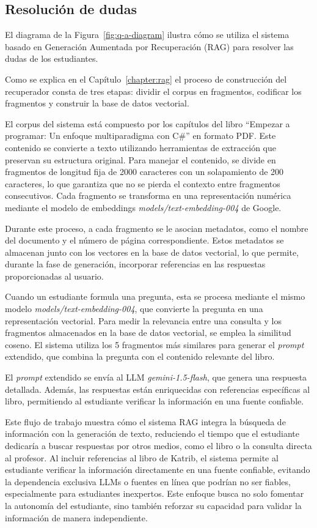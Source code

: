 \documentclass{article}
\begin{document}
\subsection{Resolución de dudas}

El diagrama de la Figura~\ref{fig:q-a-diagram} ilustra cómo se utiliza el sistema basado en Generación Aumentada por Recuperación (RAG) para resolver las dudas de los estudiantes.

Como se explica en el Capítulo~\ref{chapter:rag} el proceso de construcción del recuperador consta de tres etapas: dividir el corpus en fragmentos, codificar los fragmentos y construir la base de datos vectorial.

El corpus del sistema está compuesto por los capítulos del libro ``Empezar a programar: Un enfoque multiparadigma con C\#'' en formato PDF. Este contenido se convierte a texto utilizando herramientas de extracción que preservan su estructura original. Para manejar el contenido, se divide en fragmentos de longitud fija de 2000 caracteres con un solapamiento de 200 caracteres, lo que garantiza que no se pierda el contexto entre fragmentos consecutivos. Cada fragmento se transforma en una representación numérica mediante el modelo de embeddings \textit{models/text-embedding-004} de Google.

Durante este proceso, a cada fragmento se le asocian metadatos, como el nombre del documento y el número de página correspondiente. Estos metadatos se almacenan junto con los vectores en la base de datos vectorial, lo que permite, durante la fase de generación, incorporar referencias en las respuestas proporcionadas al usuario.

Cuando un estudiante formula una pregunta, esta se procesa mediante el mismo modelo \textit{models/text-embedding-004}, que convierte la pregunta en una representación vectorial. Para medir la relevancia entre una consulta y los fragmentos almacenados en la base de datos vectorial, se emplea la similitud coseno. El sistema utiliza los 5 fragmentos más similares para generar el \textit{prompt} extendido, que combina la pregunta con el contenido relevante del libro.

El \textit{prompt} extendido se envía al LLM \textit{gemini-1.5-flash}, que genera una respuesta detallada. Además, las respuestas están enriquecidas con referencias específicas al libro, permitiendo al estudiante verificar la información en una fuente confiable.

Este flujo de trabajo muestra cómo el sistema RAG integra la búsqueda de información con la generación de texto, reduciendo el tiempo que el estudiante dedicaría a buscar respuestas por otros medios, como el libro o la consulta directa al profesor. Al incluir referencias al libro de Katrib, el sistema permite al estudiante verificar la información directamente en una fuente confiable, evitando la dependencia exclusiva LLMs o fuentes en línea que podrían no ser fiables, especialmente para estudiantes inexpertos. Este enfoque busca no solo fomentar la autonomía del estudiante, sino también reforzar su capacidad para validar la información de manera independiente.
\end{document}
